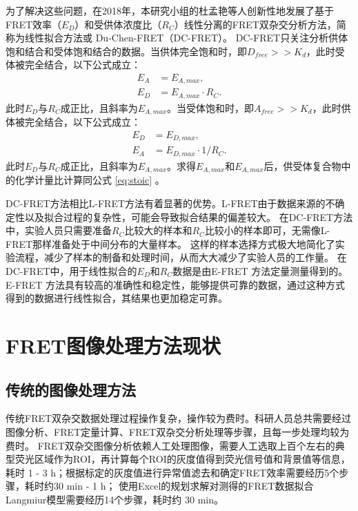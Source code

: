为了解决这些问题，在2018年，本研究小组的杜孟艳等人创新性地发展了基于FRET效率（$E_D$）和受供体浓度比（$R_C$）线性分离的FRET双杂交分析方法，简称为线性拟合方法或 Du-Chen-FRET（DC-FRET）。
DC-FRET只关注分析供体饱和结合和受体饱和结合的数据。当供体完全饱和时，即$D_{free}>>K_d$，此时受体被完全结合，以下公式成立：
\begin{align} 
    E_A &= E_{A,max}, \label{eq:ea_appro} \\
    E_D &= {E_{A,max}}{\cdot}{R_C}. \label{eq:ea_slope}
\end{align}
此时$E_D$与$R_C$成正比，且斜率为$E_{A,max}$。当受体饱和时，即$A_{free}>>K_d$，此时供体被完全结合，以下公式成立：
\begin{align}
    E_D &= E_{D,max}, \label{eq:ed_appro} \\
    E_A &= E_{D,max}{\cdot}{1/R_C}. \label{eq:ed_slope}
\end{align}
此时$E_D$与$R_C$成正比，且斜率为$E_{A,max}$。求得$E_{A,max}$和$E_{A,max}$后，供受体复合物中的化学计量比计算同公式 \ref{eq:stoic} 。

DC-FRET方法相比L-FRET方法有着显著的优势。L-FRET由于数据来源的不确定性以及拟合过程的复杂性，可能会导致拟合结果的偏差较大。
在DC-FRET方法中，实验人员只需要准备$R_C$比较大的样本和$R_C$比较小的样本即可，无需像L-FRET那样准备处于中间分布的大量样本。
这样的样本选择方式极大地简化了实验流程，减少了样本的制备和处理时间，从而大大减少了实验人员的工作量。
在DC-FRET中，用于线性拟合的$E_D$和$R_C$数据是由E-FRET 方法定量测量得到的。E-FRET 方法具有较高的准确性和稳定性，能够提供可靠的数据，通过这种方式得到的数据进行线性拟合，其结果也更加稳定可靠。
\fi

\section{FRET图像处理方法现状}

\subsection{传统的图像处理方法}

\ifshowtext
传统FRET双杂交数据处理过程操作复杂，操作较为费时。科研人员总共需要经过图像分析、FRET定量计算、FRET双杂交分析处理等步骤，且每一步处理均较为费时。
FRET双杂交图像分析依赖人工处理图像，需要人工选取上百个左右的典型荧光区域作为ROI，再计算每个ROI的灰度值得到荧光信号值和背景值等信息，耗时 1 - 3 h；根据标定的灰度值进行异常值滤去和确定FRET效率需要经历5个步骤，耗时约30 min - 1 h；
使用Excel的规划求解对测得的FRET数据拟合Langmiur模型需要经历14个步骤，耗时约 30 min。

